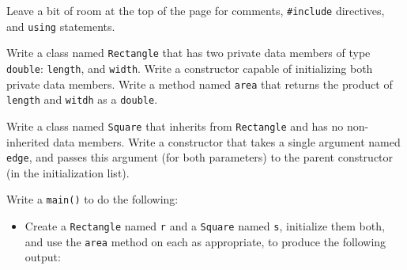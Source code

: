 \newEvenPage



Leave a bit of room at the top of the page for comments,
\texttt{#include} directives, and \texttt{using} statements.

Write a class named \texttt{Rectangle} that has two private data
members of type \texttt{double}: \texttt{length}, and
\texttt{width}.  Write a constructor capable of initializing both
private data members.  Write a method named \texttt{area} that returns
the product of \texttt{length} and \texttt{witdh} as a
\texttt{double}.

Write a class named \texttt{Square} that inherits from
\texttt{Rectangle} and has no non-inherited data members.  Write a
constructor that takes a single argument named \texttt{edge}, and
passes this argument (for both parameters) to the parent constructor (in the
initialization list).

Write a \texttt{main()} to do the following:
\begin{itemize}
  \item Create a \texttt{Rectangle} named \texttt{r} and a
    \texttt{Square} named \texttt{s}, initialize them both,
    and use the \texttt{area} method on each as appropriate, to
    produce the following output:
    \inputminted[label=Output]{text}{\docCodeDir/.classes,inheritance-1.gen.output.gen.section.all}
\end{itemize}

\newOddPage
\textQuestion{\makePageQuadrilleRuled}

\newpage

